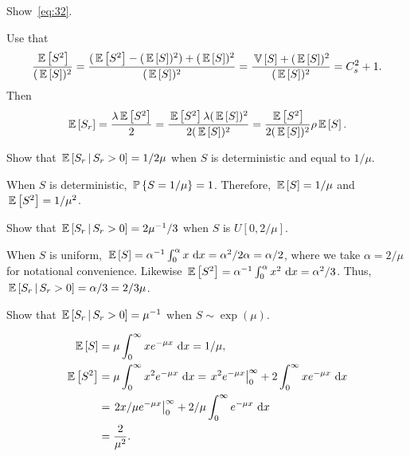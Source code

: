 \begin{question}
Show~\eqref{eq:32}. 
\begin{solution}
Use that 
\begin{equation*}
  \frac{\E{S^2}}{(\E S)^2} = 
  \frac{(\E{S^2}-(\E S)^2) + (\E S)^2}{(\E S)^2} =
  \frac{\V S + (\E S)^2}{(\E S)^2} =
  C_s^2 + 1.
\end{equation*}
Then
\begin{equation*}
  \E{S_r}=\frac{\lambda\E{S^2}}2 = \frac{\E{S^2}\lambda(\E S)^2}{2(\E S)^2}=
 \frac{\E{S^2}}{2(\E S)^2} \rho \E S.
\end{equation*}
\end{solution}
\end{question}

\begin{question}
Show that  $\E {S_r\given S_r>0} = 1/2\mu$
  when $S$ is deterministic and equal to $1/\mu$.
\begin{solution}
 When $S$ is deterministic, $\P{S=1/\mu} = 1$. Therefore, $\E S=1/\mu$ and $\E{S^2} = 1/\mu^2$. 
\end{solution}
\end{question}

\begin{question}
Show that $\E{S_r\given S_r>0} = 2\mu^{-1}/3$ when  $S$ is $U[0,2/\mu]$.
\begin{solution}
 When $S$ is uniform,
    $\E S = \alpha^{-1}\int_0^\alpha x \, \d x =\alpha^2/2 \alpha =
    \alpha/2$,
    where we take $\alpha =2/\mu$ for notational convenience. Likewise $\E{S^2} = \alpha^{-1}\int_0^\alpha x^2 \, \d x = \alpha^2/3$. Thus, $\E{S_r\given S_r>0} = \alpha/3 = 2/3\mu$.
\end{solution}
\end{question}

\begin{question}
 Show that $\E{S_r\given S_r>0} = \mu^{-1}$ when $S\sim \exp(\mu)$.
\begin{solution}
    \begin{align*}
\E S &= \mu \int_0^\infty x e^{-\mu x}\,\d x = 1/\mu, \\
\E{S^2} 
&= \mu \int_0^\infty x^2 e^{- \mu x} \,\d x = \left. x^2 e^{-\mu x} \right|_0^\infty + 2 \int_0^\infty x e^{-\mu x} \, \d x \\
&= \left. 2x/\mu e^{-\mu x} \right|_0^\infty + 2/\mu\int_0^\infty e^{-\mu x} \, \d x\\
&=\frac2{\mu^2}.
    \end{align*}
\end{solution}
\end{question}


